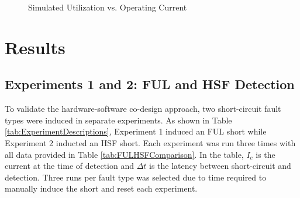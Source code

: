 \documentclass[11pt,oneside]{report}
\begin{document}
    \begin{figure}
    \centering
        \caption{Simulated Utilization vs. Operating Current}
        \label{fig:Simulated Utilization}
    \end{figure}

    \chapter{Results}\label{chap:results}
    \section*{Experiments 1 and 2: FUL and HSF Detection}
    To validate the hardware-software co-design approach, two short-circuit fault types were induced in separate experiments. As shown in Table \ref{tab:ExperimentDescriptions}, Experiment 1 induced an FUL short while Experiment 2 inducted an HSF short. Each experiment was run three times with all data provided in Table \ref{tab:FULHSFComparison}. In the table, $I_{c}$ is the current at the time of detection and $\Delta t$ is the latency between short-circuit and detection. Three runs per fault type was selected due to time required to manually induce the short and reset each experiment.
    
\end{document}

